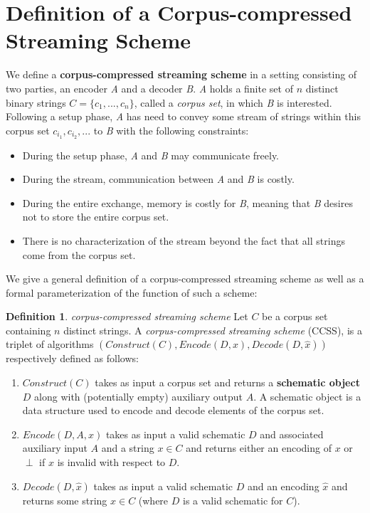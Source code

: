 \documentclass{article}
\theoremstyle{definition}
\newtheorem{definition}{Definition}[section]
\begin{document}
\tableofcontents

\section{Definition of a Corpus-compressed Streaming Scheme}

We define a \textbf{corpus-compressed streaming scheme} in a setting consisting of two parties, an 
encoder \textit{A} and a decoder \textit{B}.  \textit{A} holds a finite set of 
$n$ distinct binary strings $C=\{c_1,...,c_n\}$, called a \textit{corpus set}, 
in which \textit{B} is interested.  Following a setup phase, \textit{A} has need to convey some 
stream of strings within this corpus set $c_{i_1},c_{i_2},...$ to \textit{B} with 
the following constraints:

\begin{itemize}
\item{During the setup phase, \textit{A} and \textit{B} may communicate freely.}
\item{During the stream, communication between \textit{A} and \textit{B} is costly.}
\item{During the entire exchange, memory is costly for \textit{B}, meaning that 
\textit{B} desires not to store the entire corpus set.}
\item{There is no characterization of the stream beyond the fact that all strings come from 
the corpus set.}
\end{itemize}

\noindent We  give a general definition of a corpus-compressed streaming scheme as well as a 
formal parameterization of the function of such a scheme:  

\theoremstyle{definition}
\begin{definition}{\textit{corpus-compressed streaming scheme}}
Let $C$ be a corpus set containing $n$ distinct strings.  A \textit{corpus-compressed streaming scheme}
(CCSS), is a triplet of algorithms $(Construct(C), Encode(D,x), Decode(D,\hat{x}))$ respectively 
defined as follows:
\begin{enumerate}
\item{$Construct(C)$ takes as input a corpus set and returns a \textbf{schematic object} 
$D$ along with (potentially empty) auxiliary output $A$.  A schematic object is a data structure used to encode and decode elements of the corpus set.}
\item{$Encode(D,A,x)$ takes as input a valid schematic $D$ and associated auxiliary input $A$ 
and a string $x \in C$ and returns 
either an encoding of $x$ or $\perp$ if $x$ is invalid with respect to $D$.}
\item{$Decode(D,\hat{x})$ takes as input a valid schematic $D$ and an encoding $\hat{x}$ and 
returns some string $x \in C$ (where $D$ is a valid schematic for $C$).}
\end{enumerate}
\end{definition}
\end{document}
